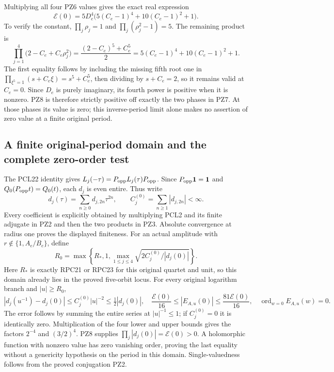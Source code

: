 Multiplying all four PZ6 values gives the exact real expression
\[
 \boxed{\quad
 \mathcal E(0)=5D_e^4\bigl(5(C_e-1)^4+10(C_e-1)^2+1\bigr).
 \quad}\tag{PZ8}
\]
To verify the constant, $\prod_j\rho_j=1$ and
$\prod_j(\rho_j^2-1)=5$. The remaining product is
\[
 \prod_{j=1}^4\bigl(2-C_e+C_e\rho_j^2\bigr)
 =\frac{(2-C_e)^5+C_e^5}{2}
 =5(C_e-1)^4+10(C_e-1)^2+1.
\]
The first equality follows by including the missing fifth root one
in $\prod_{\xi^5=1}(s+C_e\xi)=s^5+C_e^5$, then dividing by
$s+C_e=2$, so it remains valid at $C_e=0$. Since $D_e$ is purely
imaginary, its fourth power is positive when it is nonzero. PZ8 is
therefore strictly positive off exactly the two phases in PZ7.
At those phases its value is zero; this inverse-period limit alone
makes no assertion of zero value at a finite original period.

\subsection{A finite original-period domain and the complete zero-order test}
The PCL22 identity gives
$L_j(-\tau)=P_{\rm opp}L_j(\tau)P_{\rm opp}$.
Since $P_{\rm opp}\boldsymbol1=\boldsymbol1$ and
$Q_0(P_{\rm opp}t)=Q_0(t)$, each $d_j$ is even entire. Thus write
\[
 d_j(\tau)=\sum_{n\ge0}d_{j,2n}\tau^{2n},\qquad
 C_j^{(0)}=\sum_{n\ge1}|d_{j,2n}|<\infty.
 \tag{PZ9}
\]
Every coefficient is explicitly obtained by multiplying PCL2 and
its finite adjugate in PZ2 and then the two products in PZ3. Absolute
convergence at radius one proves the displayed finiteness.
For an actual amplitude with $r\notin\{1,A_e/B_e\}$, define
\[
 R_0=\max\left\{R_*,1,
       \max_{1\le j\le4}\sqrt{2C_j^{(0)}/|d_j(0)|}\right\}.
 \tag{PZ10}
\]
Here $R_*$ is exactly RPC21 or RPC23 for this original quartet and
unit, so this domain already lies in the proved five-orbit locus.
For every original logarithm branch and $|u|\ge R_0$,
\[
 |d_j(u^{-1})-d_j(0)|\le C_j^{(0)}|u|^{-2}
                       \le\tfrac12|d_j(0)|,
 \quad
 \frac{\mathcal E(0)}{16}\le|E_{A,u}(0)|
                     \le\frac{81\mathcal E(0)}{16},
 \quad \operatorname{ord}_{w=0}E_{A,u}(w)=0.
 \tag{PZ11}
\]
The error follows by summing the entire series at $|u|^{-1}\le1$;
if $C_j^{(0)}=0$ it is identically zero. Multiplication of the four
lower and upper bounds gives the factors $2^{-4}$ and $(3/2)^4$.
PZ8 supplies $\prod_j|d_j(0)|=\mathcal E(0)>0$. A holomorphic
function with nonzero value has zero vanishing order, proving the
last equality without a genericity hypothesis on the period in this
domain. Single-valuedness follows from the proved conjugation PZ2.

